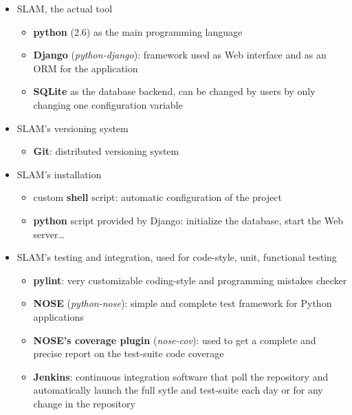 \documentclass[12pt,a4paper,twoside]{report}
\begin{document}
\begin{itemize}
\item {} 
SLAM, the actual tool
\begin{itemize}
\item {} 
\textbf{python} (2.6) as the main programming language

\item {} 
\textbf{Django} (\emph{python-django}): framework used as Web interface and as
an ORM for the application

\item {} 
\textbf{SQLite} as the database backend, can be changed by users by only
changing one configuration variable

\end{itemize}

\item {} 
SLAM's versioning system
\begin{itemize}
\item {} 
\textbf{Git}: distributed versioning system

\end{itemize}

\item {} 
SLAM's installation
\begin{itemize}
\item {} 
custom \textbf{shell} script: automatic configuration of the project

\item {} 
\textbf{python} script provided by Django: initialize the database, start
the Web server…

\end{itemize}

\item {} 
SLAM's testing and integration, used for code-style, unit, functional
testing
\begin{itemize}
\item {} 
\textbf{pylint}: very customizable coding-style and programming mistakes
checker

\item {} 
\textbf{NOSE} (\emph{python-nose}): simple and complete test framework for
Python applications

\item {} 
\textbf{NOSE's coverage plugin} (\emph{nose-cov}): used to get a complete and
precise report on the test-suite code coverage

\item {} 
\textbf{Jenkins}: continuous integration software that poll the repository
and automatically launch the full sytle and test-suite each day or
for any change in the repository


\end{itemize}
\end{itemize}
\end{document}
